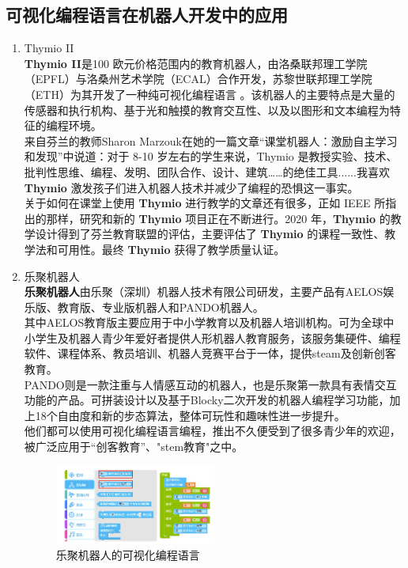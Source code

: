 \documentclass[11pt]{article}
\begin{document}
\subsection{可视化编程语言在机器人开发中的应用}
\begin{enumerate}
    \item Thymio II\\
    \textbf{Thymio II}是100
欧元价格范围内的教育机器人，由洛桑联邦理工学院（EPFL）与洛桑州艺术学院（ECAL）合作开发，苏黎世联邦理工学院（ETH）为其开发了一种纯可视化编程语言
。该机器人的主要特点是大量的传感器和执行机构、基于光和触摸的教育交互性、以及以图形和文本编程为特征的编程环境。\\
来自芬兰的教师Sharon
Marzouk在她的一篇文章``课堂机器人：激励自主学习和发现''中说道：对于
8-10 岁左右的学生来说，Thymio
是教授实验、技术、批判性思维、编程、发明、团队合作、设计、建筑\ldots{}\ldots{}的绝佳工具......我喜欢
\textbf{Thymio}
激发孩子们进入机器人技术并减少了编程的恐惧这一事实。\\
关于如何在课堂上使用 \textbf{Thymio} 进行教学的文章还有很多，正如 IEEE
所指出的那样，研究和新的 \textbf{Thymio} 项目正在不断进行。2020
年，\textbf{Thymio} 的教学设计得到了芬兰教育联盟的评估，主要评估了
\textbf{Thymio} 的课程一致性、教学法和可用性。最终 \textbf{Thymio}
获得了教学质量认证。
    \item 乐聚机器人\\
    \textbf{乐聚机器人}由乐聚（深圳）机器人技术有限公司研发，主要产品有AELOS娱乐版、教育版、专业版机器人和PANDO机器人。\\
其中AELOS教育版主要应用于中小学教育以及机器人培训机构。可为全球中小学生及机器人青少年爱好者提供人形机器人教育服务，该服务集硬件、编程软件、课程体系、教员培训、机器人竞赛平台于一体，提供steam及创新创客教育。\\
PANDO则是一款注重与人情感互动的机器人，也是乐聚第一款具有表情交互功能的产品。可拼装设计以及基于Blocky二次开发的机器人编程学习功能，加上18个自由度和新的步态算法，整体可玩性和趣味性进一步提升。\\
他们都可以使用可视化编程语言编程，推出不久便受到了很多青少年的欢迎，被广泛应用于``创客教育''、"stem教育"之中。\\
\begin{figure}[H] %
    \centering %
    \includegraphics[width=0.5\textwidth]{6.PNG} %
    \caption{乐聚机器人的可视化编程语言}
\end{figure}
\end{enumerate}
\end{document}

